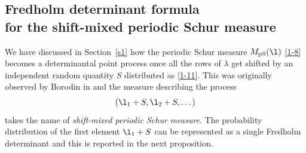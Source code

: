 \subsection[Fredholm determinant formula for the shift-mixed periodic Schur measure]{Fredholm determinant formula \\
for the shift-mixed periodic Schur measure}\label{s22}

We have discussed in Section~\ref{s1} how the periodic Schur measure $M_{\text{pS}}(\l)$ \eqref{1-8} becomes a determinantal point process once all the rows of $\lambda$ get shifted by an independent random quantity $S$ distributed as \eqref{1-11}. This was originally observed by Borodin in \cite{Borodin2007PeriodicSchur} and the measure describing the process
\begin{align}
\label{216}
(\l_1+S,\l_2+S,\dots)
\end{align}
takes the name of \emph{shift-mixed periodic Schur measure}. The probability distribution of the first element $\l_1+S$ can be represented as a single Fredholm determinant and this is reported in the next proposition.

